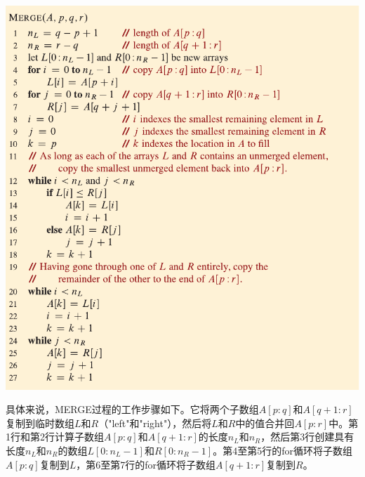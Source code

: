 \documentclass[lang=cn,newtx,10pt,scheme=chinese]{elegantbook}
\begin{document}
\includegraphics{算法导论第四版插图/第二章/归并过程伪代码.pdf}

具体来说，MERGE过程的工作步骤如下。它将两个子数组$A[p:q]$和$A[q+1:r]$复制到临时数组$L$和$R$（"left"和"right"），然后将$L$和$R$中的值合并回$A[p:r]$中。第1行和第2行计算子数组$A[p:q]$和$A[q+1:r]$的长度$n_L$和$n_R$，然后第3行创建具有长度$n_L$和$n_R$的数组$L[0:n_L-1]$和$R[0:n_R-1]$。第4至第5行的for循环将子数组$A[p:q]$复制到$L$，第6至第7行的for循环将子数组$A[q+1:r]$复制到$R$。
\end{document}
